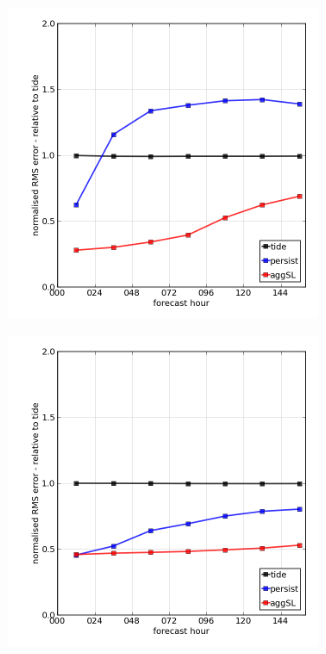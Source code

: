 \begin{figure}[H]
    \centering
    \begin{subfigure}{0.30\textwidth}
    \includegraphics[width=0.9\textwidth]{figures/plots/0013_rms_growth.png}
    \caption{}
    \end{subfigure}
    \begin{subfigure}{0.30\textwidth}
    \includegraphics[width=0.9\textwidth]{figures/plots/0043_rms_growth.png}

\end{subfigure}
\end{figure}
